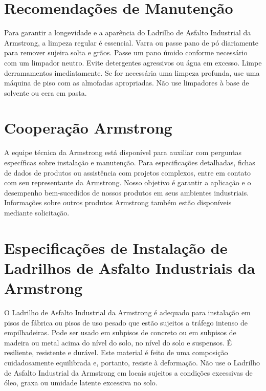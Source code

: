 \documentclass[a4paper]{article}
\begin{document}
\section*{Recomendações de Manutenção}
Para garantir a longevidade e a aparência do Ladrilho de Asfalto Industrial da Armstrong, a limpeza regular é essencial. Varra ou passe pano de pó diariamente para remover sujeira solta e grãos. Passe um pano úmido conforme necessário com um limpador neutro. Evite detergentes agressivos ou água em excesso. Limpe derramamentos imediatamente. Se for necessária uma limpeza profunda, use uma máquina de piso com as almofadas apropriadas. Não use limpadores à base de solvente ou cera em pasta.

\section{Cooperação Armstrong}
A equipe técnica da Armstrong está disponível para auxiliar com perguntas específicas sobre instalação e manutenção. Para especificações detalhadas, fichas de dados de produtos ou assistência com projetos complexos, entre em contato com seu representante da Armstrong. Nosso objetivo é garantir a aplicação e o desempenho bem-sucedidos de nossos produtos em seus ambientes industriais. Informações sobre outros produtos Armstrong também estão disponíveis mediante solicitação.

\newpage %

\section*{Especificações de Instalação de Ladrilhos de Asfalto Industriais da Armstrong}

O Ladrilho de Asfalto Industrial da Armstrong é adequado para instalação em pisos de fábrica ou pisos de uso pesado que estão sujeitos a tráfego intenso de empilhadeiras. Pode ser usado em subpisos de concreto ou em subpisos de madeira ou metal acima do nível do solo, no nível do solo e suspensos. É resiliente, resistente e durável. Este material é feito de uma composição cuidadosamente equilibrada e, portanto, resiste à deformação. Não use o Ladrilho de Asfalto Industrial da Armstrong em locais sujeitos a condições excessivas de óleo, graxa ou umidade latente excessiva no solo.
\end{document}
